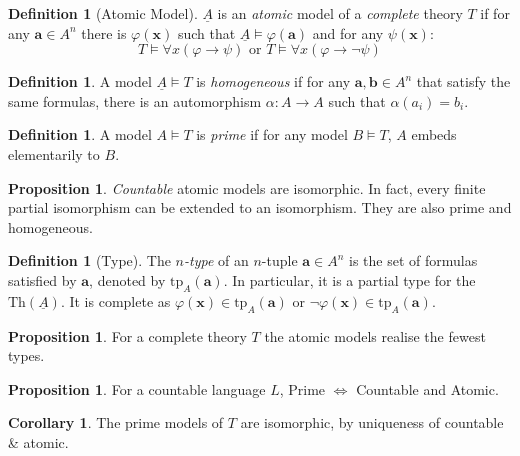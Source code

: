 \documentclass[a4paper,10pt]{article}
\theoremstyle{definition}
\newtheorem{definition}[theorem]{Definition}
\newtheorem{corollary}[theorem]{Corollary}
\newtheorem{proposition}[theorem]{Proposition}
\let\vec\mathbf
\let\phi\varphi
\begin{document}
\begin{definition}[Atomic Model]
    $\underline{A}$ is an \emph{atomic} model of a \emph{complete} theory $T$ if for any $\vec{a} \in A^n$ there is $\phi(\vec{x})$ such that $\underline{A} \models \phi(\vec{a})$ and for any $\psi(\vec{x})$:
    \[
        T \vDash \forall x (\phi \rightarrow \psi) \text{ or } T \vDash \forall x (\phi \rightarrow \neg \psi)
    \]
\end{definition}

\begin{definition}
    A model $\underline{A} \models T$ is \emph{homogeneous} if for any $\vec{a}, \vec{b} \in A^n$ that satisfy the same formulas, there is an automorphism $\alpha \colon A \longrightarrow A$ such that $\alpha(a_i) = b_i$.
\end{definition}

\begin{definition}
    A model $A \models T$ is \emph{prime} if for any model $B \models T$, $A$ embeds elementarily to $B$.
\end{definition}

\begin{proposition} 
    \emph{Countable} atomic models are isomorphic. In fact, every finite partial isomorphism can be extended to an isomorphism. They are also prime and homogeneous.
\end{proposition}

\begin{definition}[Type]
    The \emph{$n$-type} of an $n$-tuple $\vec{a} \in A^n$ is the set of formulas satisfied by $\vec{a}$, denoted by $\mathrm{tp}_A(\vec{a})$. In particular, it is a partial type for the $\mathrm{Th}(\underline{A})$. It is complete as $\phi(\vec{x}) \in \mathrm{tp}_A(\vec{a})$ or $\neg \phi(\vec{x})\in \mathrm{tp}_A(\vec{a})$.    
\end{definition}

\begin{proposition}
    For a complete theory $T$ the atomic models realise the fewest types.
\end{proposition}

\begin{proposition}
    For a countable language $L$, Prime $\iff$ Countable and Atomic.
\end{proposition}

\begin{corollary}
    The prime models of $T$ are isomorphic, by uniqueness of countable \& atomic.
\end{corollary}
\end{document}
